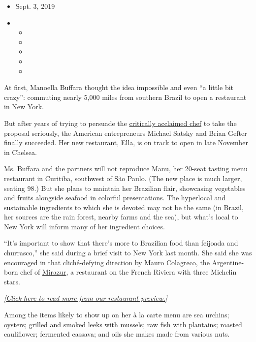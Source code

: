\begin{itemize}
\item
  Sept. 3, 2019
\item
  \begin{itemize}
  \item
  \item
  \item
  \item
  \item
  \end{itemize}
\end{itemize}

At first, Manoella Buffara thought the idea impossible and even ``a
little bit crazy'': commuting nearly 5,000 miles from southern Brazil to
open a restaurant in New York.

But after years of trying to persuade the
\href{https://www.youtube.com/watch?v=BC3T3IOYBhQ}{critically acclaimed
chef} to take the proposal seriously, the American entrepreneurs Michael
Satsky and Brian Gefter finally succeeded. Her new restaurant, Ella, is
on track to open in late November in Chelsea.

Ms. Buffara and the partners will not reproduce
\href{https://www.theworlds50best.com/discovery/Manu.html}{Manu}, her
20-seat tasting menu restaurant in Curitiba, southwest of São Paulo.
(The new place is much larger, seating 98.) But she plans to maintain
her Brazilian flair, showcasing vegetables and fruits alongside seafood
in colorful presentations. The hyperlocal and sustainable ingredients to
which she is devoted may not be the same (in Brazil, her sources are the
rain forest, nearby farms and the sea), but what's local to New York
will inform many of her ingredient choices.

``It's important to show that there's more to Brazilian food than
feijoada and churrasco,'' she said during a brief visit to New York last
month. She said she was encouraged in that cliché-defying direction by
Mauro Colagreco, the Argentine-born chef of
\href{https://www.mirazur.fr/}{Mirazur}, a restaurant on the French
Riviera with three Michelin stars.

\emph{{[}}\href{https://www.nytimes3xbfgragh.onion/2019/09/03/dining/fall-restaurant-preview-nyc.html}{\emph{Click
here to read more from our restaurant preview.}}\emph{{]}}

Among the items likely to show up on her à la carte menu are sea
urchins; oysters; grilled and smoked leeks with mussels; raw fish with
plantains; roasted cauliflower; fermented cassava; and oils she makes
made from various nuts.

